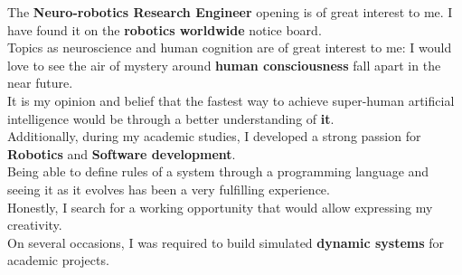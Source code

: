 The \textbf{ Neuro-robotics Research Engineer } opening is of great interest to me. I have found it on the \textbf{robotics worldwide} notice board.\\
Topics as neuroscience and human cognition are of great interest to me: I would love to see the air of mystery around \textbf{human consciousness} fall apart in the near future.\\
It is my opinion and belief that the fastest way to achieve super-human artificial intelligence would be through a better understanding of \textbf{it}.\\
Additionally, during my academic studies, I developed a strong passion for \textbf{Robotics} and \textbf{Software development}.\\
Being able to define rules of a system through a programming language and seeing it as it evolves has been a very fulfilling experience.\\
Honestly, I search for a working opportunity that would allow expressing my creativity.\\
On several occasions, I was required to build simulated \textbf{dynamic systems} for academic projects.
